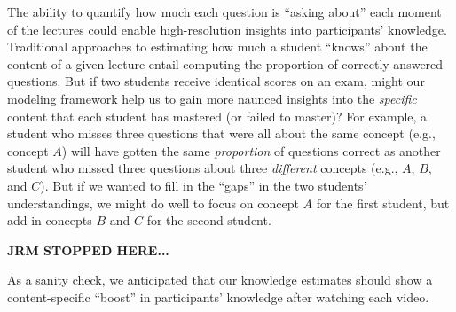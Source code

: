 \documentclass[10pt]{article}
\begin{document}
The ability to quantify how much each question is ``asking about'' each moment
of the lectures could enable high-resolution insights into participants'
knowledge. Traditional approaches to estimating how much a student ``knows''
about the content of a given lecture entail computing the proportion of
correctly answered questions. But if two students receive identical scores on
an exam, might our modeling framework help us to gain more naunced insights
into the \textit{specific} content that each student has mastered (or failed to
master)? For example, a student who misses three questions that were all about
the same concept (e.g., concept $A$) will have gotten the same
\textit{proportion} of questions correct as another student who missed three
questions about three \textit{different} concepts (e.g., $A$, $B$, and $C$).
But if we wanted to fill in the ``gaps'' in the two students' understandings,
we might do well to focus on concept $A$ for the first student, but add in
concepts $B$ and $C$ for the second student.

\textbf{JRM STOPPED HERE...}



As a sanity check, we anticipated that our knowledge estimates
should show a content-specific ``boost'' in participants' knowledge after
watching each video.
\end{document}
